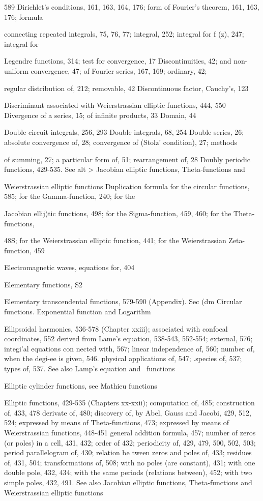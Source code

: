 589
Dirichlet's conditions, 161, 163, 164, 176; form of Fourier's theorem, 161, 163, 176; formula

connecting repeated integrals, 75, 76, 77; integral, 252; integral for f (z), 247; integral for

Legendre functions, 314; test for convergence, 17
Discontinuities, 42; and non-uniform convergence, 47; of Fourier series, 167, 169; ordinary, 42;

regular distribution of, 212; removable, 42
Discontinuous factor, Cauchy's, 123

Discriminant associated with Weierstrassian elliptic functions, 444, 550
Divergence of a series, 15; of infinite products, 33
Domain, 44

Double circuit integrals, 256, 293
Double integrals, 68, 254
Double series, 26; absolute convergence of, 28; convergence of (Stolz' condition), 27; methods

of summing, 27; a particular form of, 51; rearrangement of, 28
Doubly periodic functions, 429-535. See alt > Jacobian elliptic functions, Theta-functions and

Weierstrassian elliptic functions
Duplication formula for the circular functions, 585; for the Gamma-function, 240; for the

Jacobian ellij)tic functions, 498; for the Sigma-function, 459, 460; for the Theta-functions,

48S; for the Weierstrassian elliptic function, 441; for the Weierstrassian Zeta-function, 459

Electromagnetic waves, equations for, 404

Elementary functions, S2

Elementary transcendental functions, 579-590 (Appendix). Sec (dm Circular functions.
Exponential function and Logarithm

Ellipsoidal harmonics, 536-578 (Chapter xxiii); associated with confocal coordinates, 552
derived from Lame's equation, 538-543, 552-554; external, 576; integi'al equations con
nected with, 567; linear independence of, 560; number of, when the degi-ee is given, 546.
physical applications of, 547; .species of, 537; types of, 537. See also Lamp's equation
and \Lame\ functions

Elliptic cylinder functions, see Mathieu functions

Elliptic functions, 429-535 (Chapters xx-xxii); computation of, 485; construction of, 433, 478
derivate of, 480; discovery of, by Abel, Gauss and Jacobi, 429, 512, 524; expressed by
means of Theta-functions, 473; expressed by means of Weierstrassian functions, 448-451
general addition formula, 457; number of zeros (or poles) in a cell, 431, 432; order of
432; periodicity of, 429, 479, 500, 502, 503; period parallelogram of, 430; relation be
tween zeros and poles of, 433; residues of, 431, 504; transformations of, 508; with no
poles (are constant), 431; with one double pole, 432, 434; with the same periods (relations
between), 452; with two simple poles, 432, 491. See also Jacobian elliptic functions,
Theta-functions and Weierstrassian elliptic functions

